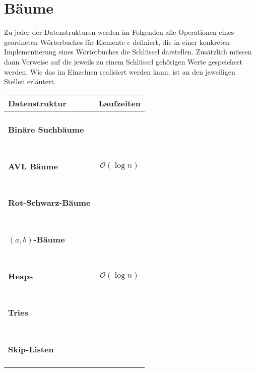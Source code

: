 \section{Bäume}
\label{sec:Baeume}

Zu jeder der Datenstrukturen werden im Folgenden alle Operationen eines geordneten Wörterbuches für Elemente $e$ definiert,
die in einer konkreten Implementierung eines Wörterbuches die Schlüssel darstellen.
Zusätzlich müssen dann Verweise auf die jeweils zu einem Schlüssel gehörigen Werte gespeichert werden.
Wie das im Einzelnen realisiert werden kann, ist an den jeweiligen Stellen erläutert.

\begin{center}
\begin{tabular}{|p{.4\linewidth}|p{.5\linewidth}|}
\hline
Datenstruktur		& Laufzeiten	\\\hline\hline
\paragraph{Binäre Suchbäume}
&
\\\hline
\paragraph{AVL Bäume}
&
$$\mathcal{O}(\log n)$$
\\\hline
\paragraph{Rot-Schwarz-Bäume}
&
\\\hline
\paragraph{$(a, b)$-Bäume}
&
\\\hline
\paragraph{Heaps}
&
$$\mathcal{O}(\log n)$$
\\\hline
\paragraph{Tries}
&
\\\hline
\paragraph{Skip-Listen}
&
\\\hline
\end{tabular}
\end{center}

